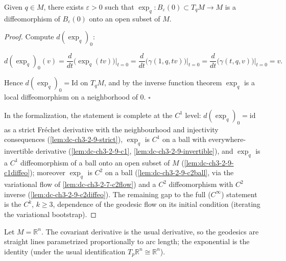 \begin{proposition}
  \label{prop:dc-ch3-2-9}
  Given $q\in M$, there exists $\varepsilon>0$ such that
  $\exp_q:B_\varepsilon(0)\subset T_qM\to M$ is a diffeomorphism of
  $B_\varepsilon(0)$ onto an open subset of $M$.
\end{proposition}
\begin{proof}
  Compute $d(\exp_q)_0$:
  
  $$
  d(\exp_q)_0(v)=\frac{d}{dt}\big(\exp_q(tv)\big)\Big|_{t=0}=\frac{d}{dt}\big(\gamma(1,q,tv)\big)\Big|_{t=0}=\frac{d}{dt}\big(\gamma(t,q,v)\big)\Big|_{t=0}=v.
  $$
  
  Hence $d(\exp_q)_0=\mathrm{Id}$ on $T_qM$, and by the inverse function theorem
  $\exp_q$ is a local diffeomorphism on a neighborhood of $0$. $\square$

  In the formalization, the statement is complete at the $C^1$ level:
  $d(\exp_q)_0 = \mathrm{id}$ as a strict Fréchet derivative with the
  neighbourhood and injectivity consequences (\cref{lem:dc-ch3-2-9-strict}),
  $\exp_q$ is $C^1$ on a ball with everywhere-invertible derivative
  (\cref{lem:dc-ch3-2-9-c1}, \cref{lem:dc-ch3-2-9-invertible}), and $\exp_q$
  is a $C^1$ diffeomorphism of a ball onto an open subset of $M$
  (\cref{lem:dc-ch3-2-9-c1diffeo}); moreover $\exp_q$ is $C^2$ on a ball
  (\cref{lem:dc-ch3-2-9-c2ball}, via the variational flow of
  \cref{lem:dc-ch3-2-7-c2flow}) and a $C^2$ diffeomorphism with $C^2$ inverse
  (\cref{lem:dc-ch3-2-9-c2diffeo}). The remaining gap to the full
  ($C^\infty$) statement is the $C^k$, $k \ge 3$, dependence of the geodesic
  flow on its initial condition (iterating the variational bootstrap).
\end{proof}

\begin{example}
  \label{ex:dc-ch3-2-10}
  Let $M=\mathbb{R}^n$. The covariant derivative is the usual derivative, so the
  geodesics are straight lines parametrized proportionally to arc length; the
  exponential is the identity (under the usual identification $T_p\mathbb{R}^n\cong\mathbb{R}^n$).
\end{example}

